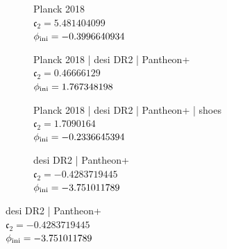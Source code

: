 
\begin{figure}[htbp]
    \centering

    \begin{subfigure}[t]{0.4\textwidth}
        \centering
        \resizebox{\linewidth}{!}{%
        }
        \caption{Planck 2018\\$\mathfrak{c}_2 = 5.481404099$\\$\phi_{\textnormal{ini}} = -0.3996640934$}
        \label{fig:HyperbolicSWGC:Planck}
    \end{subfigure}
    \hfill
    \begin{subfigure}[t]{0.40\textwidth}
        \centering
        \resizebox{\linewidth}{!}{%
        }
        \caption{Planck 2018 | \gls{desi} DR2 | Pantheon+\\$\mathfrak{c}_2 = 0.46666129$\\$\phi_{\textnormal{ini}} = 1.767348198$}
        \label{fig:HyperbolicSWGC:PlanckPPDESI}
    \end{subfigure}

    \vspace{0.35em}

    \begin{subfigure}[t]{0.40\textwidth}
        \centering
        \resizebox{\linewidth}{!}{%
        }
        \caption{Planck 2018 | \gls{desi} DR2 | Pantheon+ | \gls{shoes}\\$\mathfrak{c}_2 = 1.7090164$\\$\phi_{\textnormal{ini}} = -0.2336645394$}
        \label{fig:HyperbolicSWGC:PlanckPPSDESI}
    \end{subfigure}
    \hfill
    \begin{subfigure}[t]{0.40\textwidth}
        \centering
        \resizebox{\linewidth}{!}{%
        }
        \caption{\gls{desi} DR2 | Pantheon+\\$\mathfrak{c}_2 = -0.4283719445$\\$\phi_{\textnormal{ini}} = -3.751011789$}
        \label{fig:HyperbolicSWGC:PPD}
    \end{subfigure}


\end{figure}
